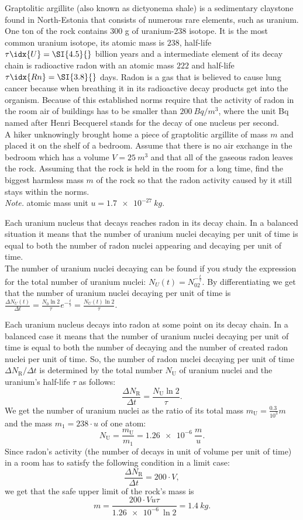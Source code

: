 {\ifEngStatement
Graptolitic argillite (also known as dictyonema shale) is a sedimentary claystone found in North-Estonia that consists of numerous rare elements, such as uranium. One ton of the rock contains 300 g of uranium-238 isotope. It is the most common uranium isotope, its atomic mass is $238$, half-life $\tau\idx{U}=\SI{4.5}{}$ billion years and a intermediate element of its decay chain is radioactive radon with an atomic mass $222$ and half-life $\tau\idx{Rn}=\SI{3.8}{}$ days. Radon is a gas that is believed to cause lung cancer because when breathing it in its radioactive decay products get into the organism. Because of this established norms require that the activity of radon in the room air of buildings has to be smaller than $\SI{200}{Bq/m^3}$, where the unit Bq named after Henri Becquerel stands for the decay of one nucleus per second.\\
A hiker unknowingly brought home a piece of graptolitic argillite of mass $m$ and placed it on the shelf of a bedroom. Assume that there is no air exchange in the bedroom which has a volume $V=\SI{25}{m^3}$ and that all of the gaseous radon leaves the rock. Assuming that the rock is held in the room for a long time, find the biggest harmless mass $m$ of the rock so that the radon activity caused by it still stays within the norms.\\
\emph{Note.} atomic mass unit $u=\SI{1.7e-27}{kg}$.
\fi


\ifEngHint
Each uranium nucleus that decays reaches radon in its decay chain. In a balanced situation it means that the number of uranium nuclei decaying per unit of time is equal to both the number of radon nuclei appearing and decaying per unit of time.\\
The number of uranium nuclei decaying can be found if you study the expression for the total number of uranium nuclei: $N_U(t) = N_02^{-\frac{t}{\tau}}$. By differentiating we get that the number of uranium nuclei decaying per unit of time is $\frac{\Delta N_U(t)}{\Delta t} = \frac{N_0\ln 2}{\tau}e^{-\frac{t}{\tau}} = \frac{N_U(t)\ln 2}{\tau}$.
\fi


\ifEngSolution
Each uranium nucleus decays into radon at some point on its decay chain. In a balanced case it means that the number of uranium nuclei decaying per unit of time is equal to both the number of decaying and the number of created radon nuclei per unit of time. So, the number of radon nuclei decaying per unit of time $\Delta N_\text{R} / \Delta t$ is determined by the total number $N_\text{U}$ of uranium nuclei and the uranium's half-life $\tau$ as follows:
\[
\frac{\Delta N_\text{R}}{\Delta t} = \frac{N_\text{U} \ln 2}{\tau}.
\] 
We get the number of uranium nuclei as the ratio of its total mass $m_\text{U} = \frac{\SI{0.3}{}}{10^3} m$ and the mass $m_1=238 \cdot u$ of one atom:
\[
N_\text{U}=\frac{m_\text{U}}{m_1}=\SI{1.26e-6}{} \frac{m}{u}.
\] 
Since radon's activity (the number of decays in unit of volume per unit of time) in a room has to satisfy the following condition in a limit case:
\[
\frac{\Delta N_\text{R}}{\Delta t} = 200\cdot V,
\] 
we get that the safe upper limit of the rock's mass is
\[
m = \frac{200\cdot V u \tau}{\SI{1.26e-6}{}\ln 2}=\SI{1.4}{kg}.
\]
\fi
}